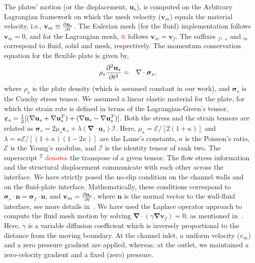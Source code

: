 \documentclass[aps,pre,twocolumn,aps,longbibliography]{revtex4-1}
\begin{document}
	
	The plates' motion (or the displacement, $\mathbf{u}_s$), is computed on the Arbitrary Lagrangian framework on which the mesh velocity ($\mathbf{v}_m$) equals the material velocity, i.e., $\mathbf{v}_m\equiv {\partial\mathbf{u}_s\over\partial t}$. The Eulerian mesh (for the fluid) implementation follows $\mathbf{v}_m=0$, and for the Lagrangian mesh, \textcolor{red}{it} follows $\mathbf{v}_m=\mathbf{v}_f$. The suffixes $_f$, $_s$ and $_m$ correspond to fluid, solid and mesh, respectively. The momentum conservation equation for the flexible plate is given by,
	\begin{eqnarray}
	\rho_s{\partial^2\mathbf{u}_s\over\partial t^2} &=& \mathbf{\nabla}\cdot\mathbf{\boldsymbol{\sigma}}_s,
	\end{eqnarray}
	where $\rho_s$ is the plate density (which is assumed constant in our work), and $\mathbf{\boldsymbol{\sigma}}_s$ is the Cauchy stress tensor. We assumed a linear elastic material for the plate, for which the strain rate is defined in terms of the Lagrangian-Green's tensor, $\boldsymbol{\varepsilon}_s={1\over2}[(\mathbf{\nabla}\mathbf{u}_s+\mathbf{\nabla}\mathbf{u}_s^T)+(\mathbf{\nabla}\mathbf{u}_s - \mathbf{\nabla}\mathbf{u}_s^T)]$. Both the stress and the strain tensors are related as $\boldsymbol{\sigma}_s=2\mu_s \boldsymbol{\varepsilon}_s+\lambda( \mathbf{\nabla}\cdot\mathbf{u}_s)\mathcal{I}$. Here, $\mu_s=\mathcal{E}/[2(1+\kappa)]$ and $\lambda=\kappa \mathcal{E}/[(1+\kappa)(1-2\kappa)]$ are the Lame's constants, $\kappa$ is the Poisson's ratio, $\mathcal{E}$ is the Young's modulus, and $\mathcal{I}$ is the identity tensor of rank two. The superscript $^T$ \textcolor{red}{denotes} the transpose of a given tensor. The flow stress information and the structural displacement communicate with each other across the interface. We have strictly posed the no-slip condition on the channel walls and on the fluid-plate interface. Mathematically, these conditions correspond to $\boldsymbol{\sigma}_s\cdot\mathbf{n}=\boldsymbol{\sigma}_f\cdot\mathbf{n}$, and $\mathbf{v}_m={\partial\mathbf{u}_s\over\partial t}$, where $\mathbf{n}$ is the normal vector to the wall-fluid interface, see more details in~\cite{CasadeiHalleux1995, Casadei2001}. We have used the Laplace operator approach to compute the fluid mesh motion by solving $\mathbf{\nabla}\cdot(\gamma\mathbf{\nabla}\mathbf{v}_f)=0$, as mentioned in~\cite{JasakTukovik2006}. Here, $\gamma$ is a variable diffusion coefficient which is inversely proportional to the distance from the moving boundary. At the channel inlet, a uniform velocity ($v_{\infty}$) and a zero pressure gradient are applied, whereas, at the outlet, we maintained a zero-velocity gradient and a fixed (zero) pressure.
\end{document}
